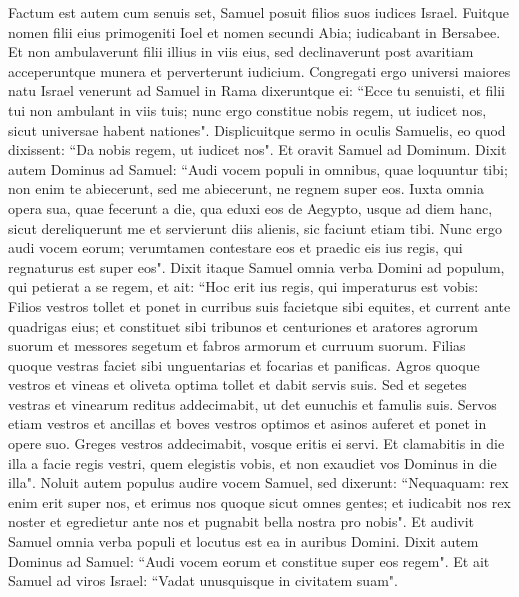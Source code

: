 \begin{biblechapter}  
\verse Factum est autem cum senuis set, Samuel posuit filios suos iudices Israel. 
\verse Fuitque nomen filii eius primogeniti Ioel et nomen secundi Abia; iudicabant in Bersabee. 
\verse Et non ambulaverunt filii illius in viis eius, sed declinaverunt post avaritiam acceperuntque munera et perverterunt iudicium. 
\verse Congregati ergo universi maiores natu Israel venerunt ad Samuel in Rama 
\verse dixeruntque ei: “Ecce tu senuisti, et filii tui non ambulant in viis tuis; nunc ergo constitue nobis regem, ut iudicet nos, sicut universae habent nationes".  
\verse Displicuitque sermo in oculis Samuelis, eo quod dixissent: “Da nobis regem, ut iudicet nos". Et oravit Samuel ad Dominum. 
\verse Dixit autem Dominus ad Samuel: “Audi vocem populi in omnibus, quae loquuntur tibi; non enim te abiecerunt, sed me abiecerunt, ne regnem super eos. 
\verse Iuxta omnia opera sua, quae fecerunt a die, qua eduxi eos de Aegypto, usque ad diem hanc, sicut dereliquerunt me et servierunt diis alienis, sic faciunt etiam tibi. 
\verse Nunc ergo audi vocem eorum; verumtamen contestare eos et praedic eis ius regis, qui regnaturus est super eos". 
\verse Dixit itaque Samuel omnia verba Domini ad populum, qui petierat a se regem, 
\verse et ait: “Hoc erit ius regis, qui imperaturus est vobis: Filios vestros tollet et ponet in curribus suis facietque sibi equites, et current ante quadrigas eius; 
\verse et constituet sibi tribunos et centuriones et aratores agrorum suorum et messores segetum et fabros armorum et curruum suorum. 
\verse Filias quoque vestras faciet sibi unguentarias et focarias et panificas. 
\verse Agros quoque vestros et vineas et oliveta optima tollet et dabit servis suis.  
\verse Sed et segetes vestras et vinearum reditus addecimabit, ut det eunuchis et famulis suis. 
\verse Servos etiam vestros et ancillas et boves vestros optimos et asinos auferet et ponet in opere suo. 
\verse Greges vestros addecimabit, vosque eritis ei servi. 
\verse Et clamabitis in die illa a facie regis vestri, quem elegistis vobis, et non exaudiet vos Dominus in die illa". 
\verse Noluit autem populus audire vocem Samuel, sed dixerunt: “Nequaquam: rex enim erit super nos, 
\verse et erimus nos quoque sicut omnes gentes; et iudicabit nos rex noster et egredietur ante nos et pugnabit bella nostra pro nobis". 
\verse Et audivit Samuel omnia verba populi et locutus est ea in auribus Domini. 
\verse Dixit autem Dominus ad Samuel: “Audi vocem eorum et constitue super eos regem". Et ait Samuel ad viros Israel: “Vadat unusquisque in civitatem suam". 
\end{biblechapter}

